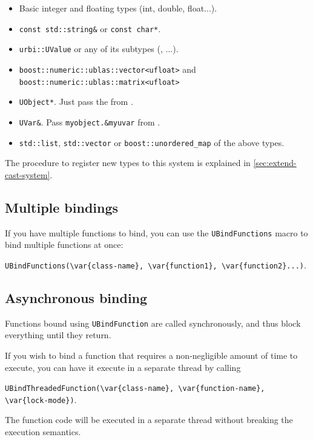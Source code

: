\begin{itemize}
\item Basic integer and floating types (int, double, float...).
\item \lstinline{const std::string&} or \lstinline{const char*}.
\item \lstinline{urbi::UValue} or any of its subtypes (\UBinary, \UList...).
\item \lstinline{boost::numeric::ublas::vector<ufloat>} and
\lstinline{boost::numeric::ublas::matrix<ufloat>}
\item \lstinline{UObject*}. Just pass the \UObject from \us.
\item \lstinline{UVar&}. Pass \lstinline{myobject.&myuvar} from \us.
\item \lstinline{std::list}, \lstinline{std::vector} or
\lstinline{boost::unordered_map} of the above types.
\end{itemize}

The procedure to register new types to this system is explained in
\autoref{sec:extend-cast-system}.

\subsection{Multiple bindings}
If you have multiple functions to bind, you can use the
\lstinline|UBindFunctions| macro to bind multiple functions at once:

\lstinline|UBindFunctions(\var{class-name}, \var{function1}, \var{function2}...)|.

\subsection{Asynchronous binding}
\label{sec:uobject:asynchronous-binding}
Functions bound using \lstinline{UBindFunction} are called synchronously, and
thus block everything until they return.

If you wish to bind a function that requires a non-negligible amount of time
to execute, you can have it execute in a separate thread by calling

\lstinline|UBindThreadedFunction(\var{class-name}, \var{function-name}, \var{lock-mode})|.

The function code will be executed in a separate thread without breaking the
\us execution semantics.

